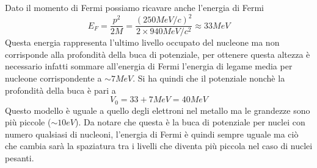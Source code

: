 Dato il momento di Fermi possiamo ricavare anche l'energia di Fermi
\begin{equation}
E_F=\frac{p^2}{2M}= \frac{(250MeV/c)^2}{2\times940MeV/c^2}\approx33MeV
\end{equation}
Questa energia rappresenta l'ultimo livello occupato del nucleone ma non corrisponde alla profondità della buca di potenziale, per ottenere questa altezza è necessario infatti sommare all'energia di Fermi l'energia di legame media per nucleone corrispondente a $\sim7MeV$.
Si ha quindi che il potenziale nonchè la profondità della buca è pari a 
\begin{equation}
V_0=33+7 MeV=40MeV
\end{equation}
Questo modello è uguale a quello degli elettroni nel metallo ma le grandezze sono più piccole ($\sim10eV$).
Da notare che questa è la buca di potenziale per nuclei con numero qualsiasi di nucleoni, l'energia di Fermi è quindi sempre uguale ma ciò che cambia sarà la spaziatura tra i livelli che diventa più piccola nel caso di nuclei pesanti.

